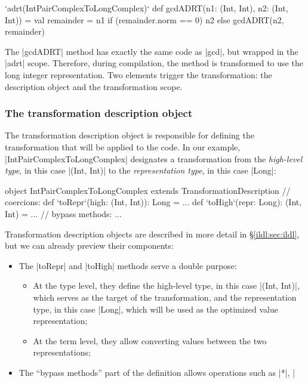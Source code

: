 \begin{lstlisting-nobreak}
`adrt(IntPairComplexToLongComplex)` {
  def gcdADRT(n1: (Int, Int), n2: (Int, Int)) = {
    val remainder = n1 %
    if (remainder.norm == 0) n2 else gcdADRT(n2, remainder)
  }
}
\end{lstlisting-nobreak}

The |gcdADRT| method has exactly the same code as |gcd|, but wrapped in the |adrt| scope. Therefore, during compilation, the method is transformed to use the long integer representation. Two elements trigger the transformation: the  description object and the transformation scope.

\subsubsection*{The transformation description object}

The transformation description object is responsible for defining the transformation that will be applied to the code. In our example, |IntPairComplexToLongComplex| designates a transformation from the \emph{high-level type}, in this case |(Int, Int)| to the \emph{representation type}, in this case |Long|:

\begin{lstlisting-nobreak}
object IntPairComplexToLongComplex
          extends TransformationDescription {
  // coercions:
  def `toRepr`(high: (Int, Int)): Long = ...
  def `toHigh`(repr: Long): (Int, Int) = ...
  // bypass methods:
  ...
}
\end{lstlisting-nobreak}

\noindent
Transformation description objects are described in more detail in \S\ref{ildl:sec:ildl}, but we can already preview their components:


\begin{itemize}
  \item The |toRepr| and |toHigh| methods serve a double purpose:
  \begin{itemize}
    \item At the type level, they define the high-level type, in this case |(Int, Int)|, which serves as the target of the transformation, and the representation type, in this case |Long|, which will be used as the optimized value representation;
    \item At the term level, they allow converting values between the two representations;
  \end{itemize}
  \item The ``bypass methods'' part of the definition allows operations such as |*|, |%
\end{itemize}



